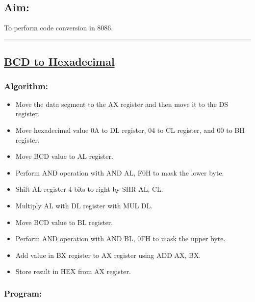 \documentclass[12pt,a4paper]{article}
\begin{document}
\begin{flushleft}
\subsection*{\textbf{Aim:}} 
To perform code conversion in 8086.

\vspace{1cm}
\hrule
\subsection*{\textbf{\underline{BCD to Hexadecimal}}}

\subsubsection*{\textbf{Algorithm:}}
\begin{itemize}
    \item Move the data segment to the AX register and then move it to the DS register.
    \item Move hexadecimal value 0A to DL register, 04 to CL register, and 00 to BH register.
    \item Move BCD value to AL register.
    \item Perform AND operation with AND AL, F0H to mask the lower byte. 
    \item Shift AL register 4 bits to right by SHR AL, CL.
    \item Multiply AL with DL register with MUL DL.
    \item Move BCD value to BL register.
    \item Perform AND operation with AND BL, 0FH to mask the upper byte.
    \item Add value in BX register to AX register using ADD AX, BX.
    \item Store result in HEX from AX register.
\end{itemize}

\newpage
\subsubsection*{\textbf{Program:}}


\end{flushleft}
\end{document}
